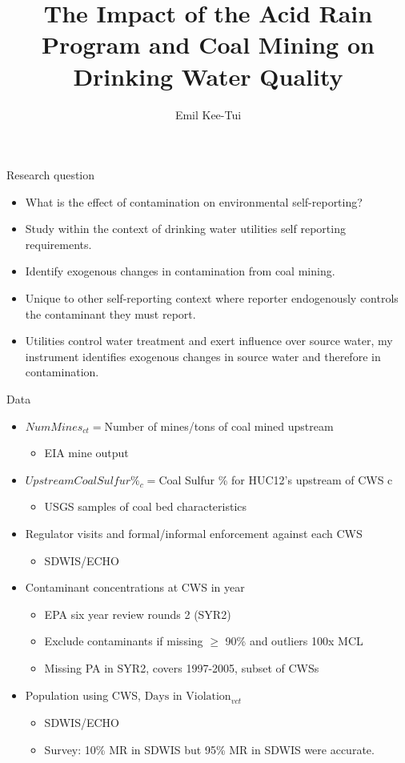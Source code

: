 \documentclass{beamer}
\title{The Impact of the Acid Rain Program and Coal Mining on Drinking Water Quality}
\author{Emil Kee-Tui}
\institute{Cornell University}
\begin{document}
\begin{frame}
\titlepage
\end{frame}

\begin{frame}{Research question}
    \begin{itemize}
        \item What is the effect of contamination on environmental self-reporting?
        \item Study within the context of drinking water utilities self reporting requirements.
        \item Identify exogenous changes in contamination from coal mining.
        \item Unique to other self-reporting context where reporter endogenously controls the contaminant they must report.
        \item Utilities control water treatment and exert influence over source water, my instrument identifies exogenous changes in source water and therefore in contamination.
    \end{itemize}
\end{frame}

\begin{frame}{Data}
\begin{itemize}
    \item $NumMines_{ct}=$Number of mines/tons of coal mined upstream
    \begin{itemize}
        \item EIA mine output
    \end{itemize}
    \item $UpstreamCoalSulfur\%_c=$Coal Sulfur \% for HUC12's upstream of CWS c
    \begin{itemize}
        \item USGS samples of coal bed characteristics
    \end{itemize}
    \item Regulator visits and formal/informal enforcement against each CWS
    \begin{itemize}
        \item SDWIS/ECHO
    \end{itemize}
    \item Contaminant concentrations at CWS in year
    \begin{itemize}
        \item EPA six year review rounds 2 (SYR2)
        \item Exclude contaminants if missing $\geq$ 90\% and outliers 100x MCL
        \item Missing PA in SYR2, covers 1997-2005, subset of CWSs
    \end{itemize}
    \item Population using CWS, $\text{Days in Violation}_{vct}$
    \begin{itemize}
        \item SDWIS/ECHO
        \item Survey: 10\% MR in SDWIS but 95\% MR in SDWIS were accurate.
    \end{itemize}
\end{itemize}
\end{frame}
\end{document}
